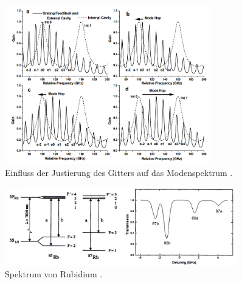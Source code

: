 \begin{figure}
    \centering
    \includegraphics[width=0.8\textwidth]{ModeShifts.png}
    \caption{Einfluss der Justierung des Gitters auf das Modenspektrum \cite{ap60}.}
    \label{fig:ModeShifts}
\end{figure}


\begin{figure}
    \centering
    \includegraphics[width=0.9\textwidth]{SpectrumIdeal.png}
    \caption{Spektrum von Rubidium \cite{ap60}.}
    \label{fig:RbSpectrum}
\end{figure}